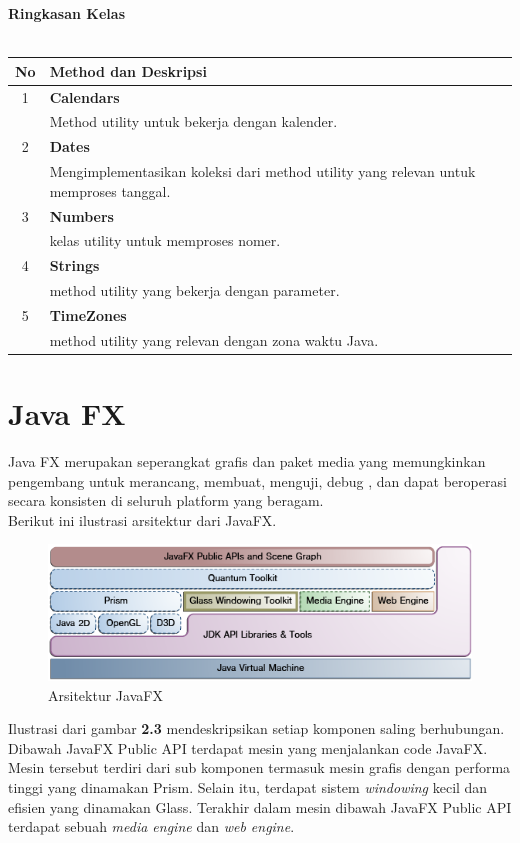 	\noindent \textbf{Ringkasan Kelas}\cite{ical}\\ \\
	\begin{tabular}{|c|p{12cm}|}
		\hline
		\textbf{No} & \textbf{Method dan Deskripsi} \\ \hline \hline
		1 & \textbf{Calendars}\\
			&	Method utility untuk bekerja dengan kalender.\\ \hline
		2 & \textbf{Dates}\\
			&	Mengimplementasikan koleksi dari method utility yang relevan untuk memproses tanggal. \\ \hline
		3 & \textbf{Numbers}\\
			&	kelas utility untuk memproses nomer. \\ \hline
		4 & \textbf{Strings}\\
			&	method utility yang bekerja dengan parameter. \\ \hline
		5 & \textbf{TimeZones}\\
			&	method utility yang relevan dengan zona waktu Java. \\ \hline
		\end{tabular}

\section{Java FX}
Java FX merupakan seperangkat grafis dan paket media yang memungkinkan pengembang untuk merancang, membuat, menguji, debug , dan dapat beroperasi secara konsisten di seluruh platform yang beragam.\\
Berikut ini ilustrasi arsitektur dari JavaFX.
\begin{figure}[H]
	\centering
	\includegraphics[scale=0.7]{Gambar/arsitekturJavaFX}
	\caption{Arsitektur JavaFX}
	\end{figure}
	
Ilustrasi dari gambar \textbf{2.3} mendeskripsikan setiap komponen saling berhubungan. Dibawah JavaFX Public API terdapat mesin yang menjalankan code JavaFX. Mesin tersebut terdiri dari sub komponen termasuk mesin grafis dengan performa tinggi yang dinamakan Prism. Selain itu, terdapat sistem \textit{windowing} kecil dan efisien yang dinamakan Glass. Terakhir dalam mesin dibawah JavaFX Public API terdapat sebuah \textit{media engine} dan \textit{web engine}.





